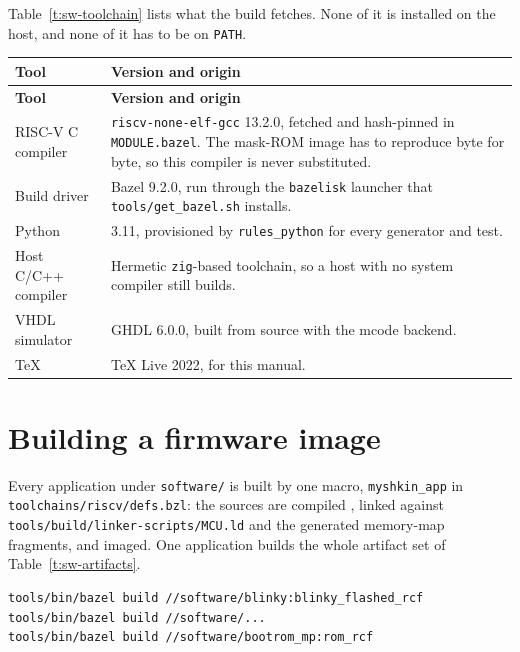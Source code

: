 \documentclass[11pt,pdftex,openany,letterpaper]{report}
\begin{document}
\noindent Table~\ref{t:sw-toolchain} lists what the build fetches. None of it is installed on the host, and none of it has to be on \texttt{PATH}.

\begin{tabularx}{\textwidth}{p{4.4cm} X}
\caption{Tools the build provisions on first use.} \label{t:sw-toolchain} \\
\hline \textbf{Tool} & \textbf{Version and origin} \\ \hline \endfirsthead
\hline \textbf{Tool} & \textbf{Version and origin} \\ \hline \endhead
RISC-V C compiler & \texttt{riscv-none-elf-gcc} 13.2.0, fetched and hash-pinned in \texttt{MODULE.bazel}. The mask-ROM image has to reproduce byte for byte, so this compiler is never substituted. \\
\rowcolor{tablehighlightcolor} Build driver & Bazel 9.2.0, run through the \texttt{bazelisk} launcher that \texttt{tools/get\_bazel.sh} installs. \\
Python & 3.11, provisioned by \texttt{rules\_python} for every generator and test. \\
\rowcolor{tablehighlightcolor} Host C/C++ compiler & Hermetic \texttt{zig}-based toolchain, so a host with no system compiler still builds. \\
VHDL simulator & GHDL 6.0.0, built from source with the mcode backend. \\
\rowcolor{tablehighlightcolor} \TeX{} & TeX Live 2022, for this manual. \\
\hline
\end{tabularx}

\section{Building a firmware image} \label{ss:swimages}

Every application under \texttt{software/} is built by one macro, \texttt{myshkin\_app} in \texttt{toolchains/riscv/defs.bzl}: the sources are compiled , linked against \texttt{tools/build/linker-scripts/MCU.ld} and the generated memory-map fragments, and imaged. One application builds the whole artifact set of Table~\ref{t:sw-artifacts}.

\begin{lstlisting}[language=bash]
tools/bin/bazel build //software/blinky:blinky_flashed_rcf
tools/bin/bazel build //software/...
tools/bin/bazel build //software/bootrom_mp:rom_rcf
\end{lstlisting}
\end{document}
